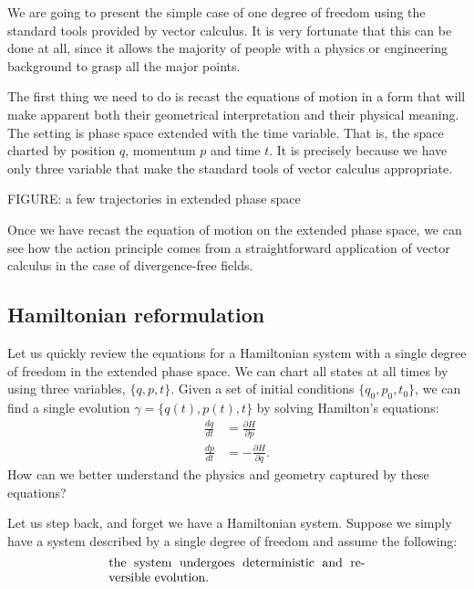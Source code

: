 \documentclass[10pt,twocolumn, nofootinbib]{revtex4-2}
\begin{document}
We are going to present the simple case of one degree of freedom using the standard tools provided by vector calculus. It is very fortunate that this can be done at all, since it allows the majority of people with a physics or engineering background to grasp all the major points.

The first thing we need to do is recast the equations of motion in a form that will make apparent both their geometrical interpretation and their physical meaning. The setting is phase space extended with the time variable. That is, the space charted by position $q$, momentum $p$ and time $t$. It is precisely because we have only three variable that make the standard tools of vector calculus appropriate.

FIGURE: a few trajectories in extended phase space

Once we have recast the equation of motion on the extended phase space, we can see how the action principle comes from a straightforward application of vector calculus in the case of divergence-free fields.

\subsection{Hamiltonian reformulation}

Let us quickly review the equations for a Hamiltonian system with a single degree of freedom in the extended phase space. We can chart all states at all times by using three variables, $\{q,p,t\}$. Given a set of initial conditions $\{q_0,p_0,t_0\}$, we can find a single evolution $\gamma = \{q(t), p(t), t\}$ by solving Hamilton's equations:
\begin{equation}\label{Hamilton_equations}
\begin{aligned}
	\frac{dq}{dt} &= \frac{\partial H}{\partial p} \\
	\frac{dp}{dt} &= -\frac{\partial H}{\partial q}.
\end{aligned}
\end{equation}
How can we better understand the physics and geometry captured by these equations?

Let us step back, and forget we have a Hamiltonian system. Suppose we simply have a system described by a single degree of freedom and assume the following:
\begin{align}\label{Detrev_assumptions}
	\parbox{2.8in}{the system undergoes deterministic and reversible evolution.}
\end{align}
\end{document}
